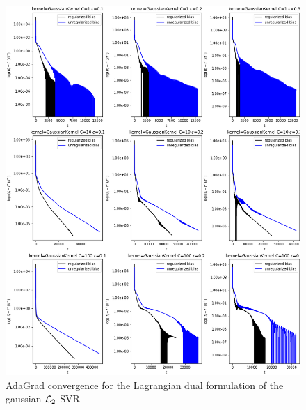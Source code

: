 \begin{figure}[H]
	\centering
	\includegraphics[scale=0.55]{img/gaussian_lagrangian_dual_l2_svr_loss_history}
	\caption{AdaGrad convergence for the Lagrangian dual formulation of the gaussian $\protect \mathcal{L}_2$-SVR}
	\label{fig:gaussian_lagrangian_dual_l2_svr_loss_history}
\end{figure}
